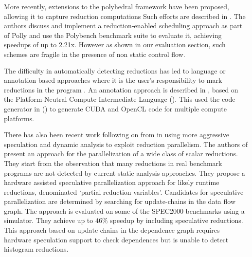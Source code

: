 



More recently, extensions
to the polyhedral framework have been proposed, allowing  it to capture
reduction computations \cite{chi1997optimizing, gupta2006simplifying,
stock2014framework} Such efforts are described
in \cite{Doerfert2015Polly}.  The authors discuss and implement a
reduction-enabled scheduling approach as part of Polly and use the
Polybench benchmark suite to evaluate it, achieving speedups of up to
2.21x. However as shown in our evaluation section, such schemes are
fragile in the presence of non static control flow.

 The difficulty in automatically detecting
reductions has led to language or annotation based approaches where it
is the user's responsibility to mark reductions in the
program \cite{deitz2002high}.
An annotation approach is described in 
\cite{Reddy2016Reduction}, based on the Platform-Neutral Compute Intermediate Language (\cite{baghdadi2015PENCIL}).
This used the code generator
in (\cite{Verdoolaege:2013:PPC:2400682.2400713}) to generate CUDA and OpenCL code for multiple compute platforms.



There has also been recent work following on
from \cite{rauchwerger1999lrpd} in using more aggressive
speculation and dynamic analysis \cite{aguilar2015unified} to exploit reduction parallelism.
The authors of \cite{Han2010Speculative} present an approach for the parallelization of a wide class of scalar reductions.
They start from the observation that many reductions in real benchmark programs are not detected by current static analysis approaches.
They propose a hardware assisted speculative parallelization approach for likely runtime reductions, denominated `partial reduction variables'.
Candidates for speculative parallelization are determined by searching for update-chains in the data flow graph.
The approach is evaluated on some of the SPEC2000 benchmarks using a simulator.
They achieve up to $46\%$ speedup by including speculative reductions.
This approach
based on update chains in the dependence graph requires hardware
speculation support to check dependences but is unable to detect
histogram reductions.

